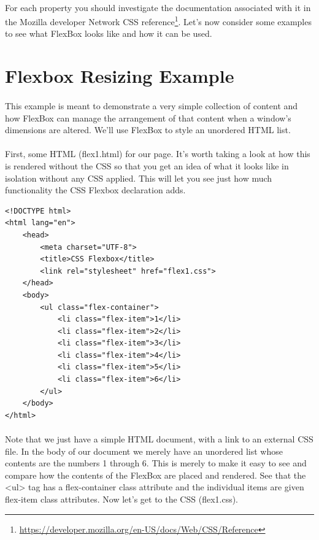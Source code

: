 \paragraph{} For each property you should investigate the documentation associated with it in the Mozilla developer Network CSS reference\footnote{\url{https://developer.mozilla.org/en-US/docs/Web/CSS/Reference}}. Let's now consider some examples to see what FlexBox looks like and how it can be used.




\section{Flexbox Resizing Example}
\paragraph{} This example is meant to demonstrate a very simple collection of content and how FlexBox can manage the arrangement of that content when a window's dimensions are altered. We'll use FlexBox to style an unordered HTML list.
\paragraph{} First, some HTML (flex1.html) for our page. It's worth taking a look at how this is rendered without the CSS so that you get an idea of what it looks like in isolation without any CSS applied. This will let you see just how much functionality the CSS Flexbox declaration adds.

\begin{lstlisting}
<!DOCTYPE html>
<html lang="en">
	<head>
		<meta charset="UTF-8">
  		<title>CSS Flexbox</title>
  		<link rel="stylesheet" href="flex1.css">
	</head>
	<body>
		<ul class="flex-container">
			<li class="flex-item">1</li>
			<li class="flex-item">2</li>
			<li class="flex-item">3</li>
			<li class="flex-item">4</li>
			<li class="flex-item">5</li>
			<li class="flex-item">6</li>
		</ul>
	</body>
</html>
\end{lstlisting}

\paragraph{} Note that we just have a simple HTML document, with a link to an external CSS file. In the body of our document we merely have an unordered list whose contents are the numbers 1 through 6. This is merely to make it easy to see and compare how the contents of the FlexBox are placed and rendered. See that the <ul> tag has a flex-container class attribute and the individual items are given flex-item class attributes. Now let's get to the CSS (flex1.css).

